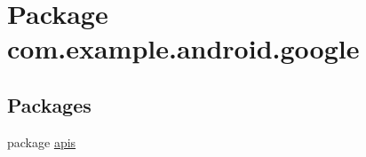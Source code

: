 \hypertarget{namespacecom_1_1example_1_1android_1_1google}{\section{Package com.\-example.\-android.\-google}
\label{namespacecom_1_1example_1_1android_1_1google}
}
\subsection*{Packages}
\begin{DoxyCompactItemize}
\item 
package \hyperlink{namespacecom_1_1example_1_1android_1_1google_1_1apis}{apis}
\end{DoxyCompactItemize}
